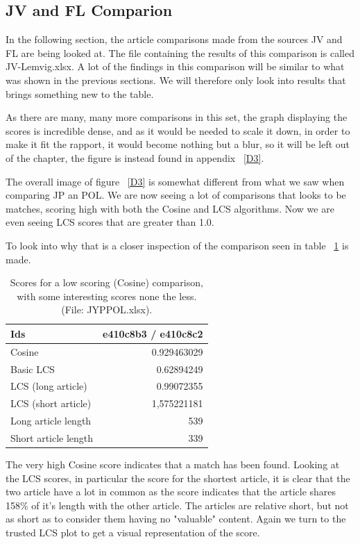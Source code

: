 \subsection{JV and FL Comparion}
In the following section, the article comparisons made from the sources JV and FL are being looked at. The file containing the results of this comparison is called JV-Lemvig.xlsx. A lot of the findings in this comparison will be similar to what was shown in the previous sections. We will therefore only look into results that brings something new to the table.

As there are many, many more comparisons in this set, the graph displaying the scores is incredible dense, and as it would be needed to scale it down, in order to make it fit the rapport, it would become nothing but a blur, so it will be left out of the chapter, the figure is instead found in appendix ~\ref{D3}.

The overall image of figure ~\ref{D3} is somewhat different from what we saw when comparing JP an POL. We are now seeing a lot of comparisons that looks to be matches, scoring high with both the Cosine and LCS algorithms. Now we are even seeing LCS scores that are greater than 1.0.

To look into why that is a closer inspection of the comparison seen in table ~\ref{JVFL100} is made.

\begin{table}
\begin{center}
	\begin{tabular}{l | r}
	Ids & e410c8b3 / e410c8c2\\ \hline
	Cosine & 0.929463029\\ \hline
	Basic LCS & 0.62894249\\ \hline
	LCS (long article) & 0.99072355\\ \hline
	LCS (short article) & 1,575221181\\ \hline
	Long article length & 539\\ \hline
	Short article length & 339\\ \hline	
	\end{tabular}
\end{center}
\caption{Scores for a low scoring (Cosine) comparison, with some interesting scores none the less. (File: JYPPOL.xlsx).}
\label{JVFL100}
\end{table}

The very high Cosine score indicates that a match has been found. Looking at the LCS scores, in particular the score for the shortest article, it is clear that the two article have a lot in common as the score indicates that the article shares 158\% of it's length with the other article. The articles are relative short, but not as short as to consider them having no "valuable" content. Again we turn to the trusted LCS plot to get a visual representation of the score.


